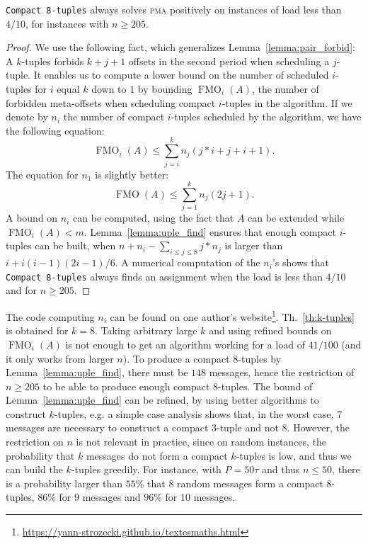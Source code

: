 \documentclass[a4paper,UKenglish,cleveref, autoref, thm-restate]{lipics-v2019}
\DeclareMathOperator{\Fmo}{FMO}
\newcommand\pma{\textsc{pma}\xspace}
\begin{document}
\begin{theorem}\label{th:k-tuples}
\texttt{Compact 8-tuples} always solves \pma positively on instances of load less than $4/10$, for instances with $n \geq 205$.
\end{theorem}
\begin{proof}
We use the following fact, which generalizes Lemma~\ref{lemma:pair_forbid}: A $k$-tuples forbids $k+j+1$ offsets in the second period when scheduling a $j$-tuple. 
It enables us to compute a lower bound on the number of scheduled $i$-tuples for $i$ equal $k$ down to $1$ by bounding $\Fmo_i(A)$, the number of forbidden meta-offsets when scheduling compact $i$-tuples in the algorithm.
If we denote by $n_i$ the number of compact $i$-tuples scheduled by the algorithm,
we have the following equation:  $$ \Fmo_i(A) \leq \displaystyle{\sum_{j=i}^k n_j(j*i + j + i+ 1)}.$$
The equation for $n_1$ is slightly better: 
$$ \Fmo(A) \leq \displaystyle{\sum_{j=1}^k n_j(2j + 1)}.$$
A bound on $n_i$ can be computed, using the fact that $A$ can be extended while $\Fmo_i(A) < m$. 
Lemma~\ref{lemma:uple_find} ensures that enough compact $i$-tuples can be built, when $n + n_i - \sum_{i \leq j \leq 8} j*n_j$ is larger than $i + i(i-1)(2i-1)/6$. 
A numerical computation of the $n_i$'s shows that \texttt{Compact 8-tuples} always finds an assignment when the load is less than $4/10$ and for $n \geq 205$.
\end{proof}

The code computing $n_i$ can be found on one author's website\footnote{\url{https://yann-strozecki.github.io/textesmaths.html}}. Th.~\ref{th:k-tuples} is obtained for $k=8$. Taking arbitrary large $k$ and using refined bounds on $\Fmo_i(A)$ is not enough to get an algorithm working for a load of $41/100$ (and it only works from larger $n$). To produce a compact $8$-tuples by Lemma~\ref{lemma:uple_find}, there must be $148$ messages, hence the restriction of $n \geq 205$ to be able to produce enough compact $8$-tuples.
The bound of Lemma~\ref{lemma:uple_find} can be refined, by using better algorithms to construct $k$-tuples, e.g. a simple case analysis shows that, in the worst case, $7$ messages are necessary to construct a compact $3$-tuple and not $8$. However, the restriction on $n$ is not relevant in practice, since on random instances, the probability that $k$ messages do not form a compact $k$-tuples is low, and thus we can build the $k$-tuples greedily. For instance, with $P=50\tau$ and thus $n \leq 50$, there is a probability larger than $55\%$ that $8$ random messages form a compact $8$-tuples, $86\%$ for $9$ messages and $96\%$ for $10$ messages.
\end{document}
